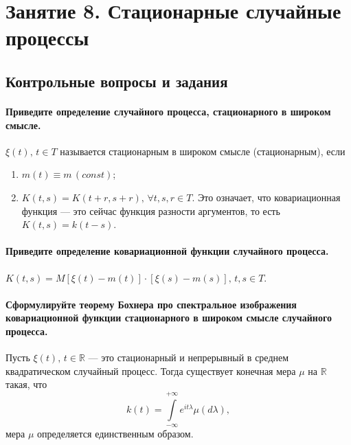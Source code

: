 \chapter*{Занятие 8. Стационарные случайные процессы}

\section*{Контрольные вопросы и задания}

\subsubsection*{Приведите определение случайного процесса, стационарного в широком смысле.}

$ \xi \left( t \right), \, t \in T$ называется стационарным в широком смысле (стационарным), если
\begin{enumerate}
  \item $m \left( t \right) \equiv m \, \left( const \right) $;
  \item $K \left( t, s \right) = K \left( t + r, s + r \right), \, \forall t, s, r \in T$.
  Это означает, что ковариационная функция --- это сейчас функция разности аргументов,
  то есть $K \left( t, s \right) = k \left( t - s \right) $.
\end{enumerate}

\subsubsection*{Приведите определение ковариационной функции случайного процесса.}

$K \left( t, s \right) =
  M \left[ \xi \left( t \right) - m \left( t \right) \right] \cdot
  \left[ \xi \left( s \right) - m \left( s \right) \right], \,
  t, s \in T$.

\subsubsection*{Сформулируйте теорему Бохнера про спектральное изображения ковариационной функции
                стационарного в широком смысле случайного процесса.}

Пусть $ \xi \left( t \right), \, t \in \mathbb{R}$ ---
это стационарный и непрерывный в среднем квадратическом случайный процесс.
Тогда существует конечная мера $ \mu $ на $ \mathbb{R}$ такая, что
$$k \left( t \right) =
  \int \limits_{-\infty}^{+\infty} e^{it \lambda } \mu \left( d \lambda \right),$$
мера $ \mu $ определяется единственным образом.

